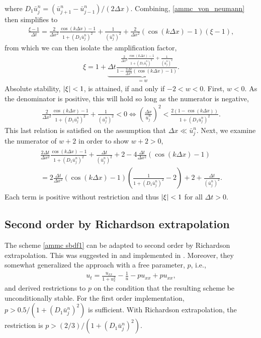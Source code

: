 where $D_1\bar u^n_j = (\bar u^n_{j+1} -  \bar u^n_{j-1})/(2\Delta x)$.
Combining, \eqref{ammc_von_neumann} then simplifies to 
\begin{align}
        \frac{\xi - 1}{\Delta t} 
= \frac{2}{\Delta x^2}\frac{\cos(k\Delta x)-1}{1 +(
	D_1\bar u^n_j 
	)^2}
+ \frac{1}{(\bar u_j^n)^2}
+ \frac{2}{\Delta x^2}(\cos(k\Delta x)-1)(\xi-1),
\end{align}
from which we can then isolate the amplification factor,
\begin{align}
        \xi 
= 1+\underbrace{\Delta t \frac{\frac{2}{\Delta x^2}\frac{\cos(k\Delta x)-1}{1 +(
	D_1\bar u^n_j 
	)^2}
+ \frac{1}{(\bar u_j^n)^2}}{1-\frac{2\Delta t}{\Delta x^2}(\cos(k\Delta x)-1)}}_{=w}.
\end{align}
Absolute stability, $\left|\xi\right| < 1$, is attained, if and only if $-2<w<0$. First, $w<0$. As the denominator is positive, this will hold so long as the numerator is negative, 
\begin{align}
        \frac{2}{\Delta x^2}\frac{\cos(k\Delta x)-1}{1 +(
	D_1\bar u^n_j 
	)^2}
+ \frac{1}{(\bar u_j^n)^2} < 0 
\iff 
\left(\frac{\Delta x}{\bar u^n_j} \right)^2 
< \frac{2(1-\cos(k\Delta x))}{1 + (D_1\bar u^n_j)^2}.
\end{align}
This last relation is satisfied on the assumption that $\Delta x \ll \bar u^n_j$.  Next, we examine the numerator of $w+2$ in order to show $w+2 > 0$,
\begin{align}
\begin{split}
  \frac{2\Delta t}{\Delta x^2}\frac{\cos(k\Delta x)-1}{1 + (D_1 \bar u^n_j)^2} + \frac{\Delta t}{(\bar u^n_j)^2} + 2 - 4\frac{\Delta t}{\Delta x^2}(\cos(k\Delta x)-1) 
\\
= 2\frac{\Delta t}{\Delta x^2}(\cos(k\Delta x)-1)\left(
\frac{1}{1 + (D_1 \bar u^n_j)^2} - 2 \right)
+ 2 + \frac{\Delta t}{(\bar u^n_j)^2}.
\end{split}
\end{align}
Each term is positive without restriction and thus $\left|\xi\right| < 1$ for all $\Delta t > 0$.

\subsection{Second order by Richardson extrapolation}
The scheme \eqref{ammc sbdf1} can be adapted to second order by Richardson extrapolation. This was suggested in \cite{smereka2003semi} and implemented in \cite{duchemin2014explicit}. Moreover, they somewhat generalized the approach with a free parameter, $p$, i.e.,
\begin{align}
u_t = \frac{u_{xx}}{1 + u_x^2} - \frac{1}{u} - pu_{xx} + pu_{xx}, 
\end{align}
and derived restrictions to $p$ on the condition that the resulting scheme be unconditionally stable. For the first order implementation, $p > 0.5/(1 + (D_1 \bar u^n_j)^2)$ is sufficient. With Richardson extrapolation, the restriction is $p > (2/3)/(1 + (D_1 \bar u^n_j)^2)$.

